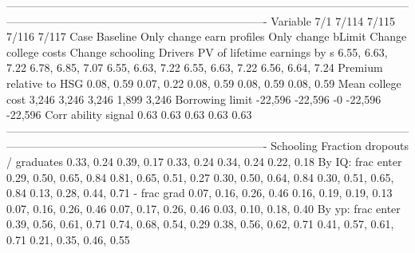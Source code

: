 ----------------------------------------------------------------------------------------------------------------------------------------------------------------------------------
                              Variable                          7/1                        7/114                    7/115                       7/116                        7/117
                                  Case                     Baseline    Only change earn profiles       Only change bLimit        Change college costs             Change schooling
                               Drivers                                                                                                                                            
          PV of lifetime earnings by s             6.55, 6.63, 7.22             6.78, 6.85, 7.07         6.55, 6.63, 7.22            6.55, 6.63, 7.22             6.56, 6.64, 7.24
               Premium relative to HSG                   0.08, 0.59                   0.07, 0.22               0.08, 0.59                  0.08, 0.59                   0.08, 0.59
                     Mean college cost                        3,246                        3,246                    3,246                       1,899                        3,246
                       Borrowing limit                      -22,596                      -22,596                       -0                     -22,596                      -22,596
                   Corr ability signal                         0.63                         0.63                     0.63                        0.63                         0.63
----------------------------------------------------------------------------------------------------------------------------------------------------------------------------------
                             Schooling                                                                                                                                            
         Fraction dropouts / graduates                   0.33, 0.24                   0.39, 0.17               0.33, 0.24                  0.34, 0.24                   0.22, 0.18
                     By IQ: frac enter       0.29, 0.50, 0.65, 0.84       0.81, 0.65, 0.51, 0.27   0.30, 0.50, 0.64, 0.84      0.30, 0.51, 0.65, 0.84       0.13, 0.28, 0.44, 0.71
                           - frac grad       0.07, 0.16, 0.26, 0.46       0.16, 0.19, 0.19, 0.13   0.07, 0.16, 0.26, 0.46      0.07, 0.17, 0.26, 0.46       0.03, 0.10, 0.18, 0.40
                     By yp: frac enter       0.39, 0.56, 0.61, 0.71       0.74, 0.68, 0.54, 0.29   0.38, 0.56, 0.62, 0.71      0.41, 0.57, 0.61, 0.71       0.21, 0.35, 0.46, 0.55
